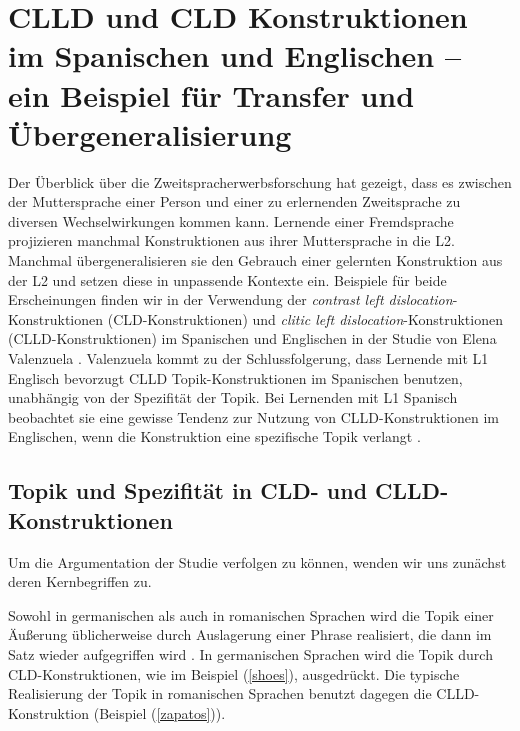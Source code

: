 \section{CLLD und CLD Konstruktionen im Spanischen und Englischen -- ein Beispiel für Transfer und Übergeneralisierung}


Der Überblick über die Zweitspracherwerbsforschung hat gezeigt, dass es zwischen der Muttersprache einer Person und einer zu erlernenden Zweitsprache zu diversen Wechselwirkungen kommen kann.
Lernende einer Fremdsprache projizieren manchmal Konstruktionen aus ihrer Muttersprache in die L2.
Manchmal übergeneralisieren sie den Gebrauch einer gelernten Konstruktion aus der L2 und setzen diese in unpassende Kontexte ein.
Beispiele für beide Erscheinungen finden wir in der Verwendung der \textit{contrast left dislocation}-Konstruktionen (CLD-Konstruktionen) und \textit{clitic left dislocation}-Konstruktionen (CLLD-Konstruktionen) im Spanischen und Englischen in der Studie von Elena Valenzuela \cite{Valenzuela05}.
Valenzuela kommt zu der Schlussfolgerung, dass Lernende mit L1 Englisch bevorzugt CLLD Topik-Konstruktionen im Spanischen benutzen, unabhängig von der Spezifität der Topik.
Bei Lernenden mit L1 Spanisch beobachtet sie eine gewisse Tendenz zur Nutzung von CLLD-Konstruktionen im Englischen, wenn die Konstruktion eine spezifische Topik verlangt \cite{Valenzuela05}.




\subsection{Topik und Spezifität in CLD- und CLLD-Konstruktionen}
Um die Argumentation der Studie \cite{Valenzuela05} verfolgen zu können, wenden wir uns zunächst deren Kernbegriffen zu.

Sowohl in germanischen als auch in romanischen Sprachen wird die Topik einer Äußerung üblicherweise durch Auslagerung einer Phrase realisiert, die dann im Satz wieder aufgegriffen wird \cite{Valenzuela05}.
In germanischen Sprachen wird die Topik durch CLD-Konstruktionen, wie im Beispiel (\ref{shoes}), ausgedrückt.
Die typische Realisierung der Topik in romanischen Sprachen benutzt dagegen die CLLD-Konstruktion (Beispiel (\ref{zapatos})).

